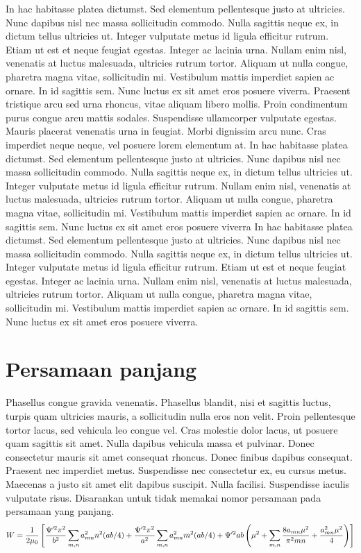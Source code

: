 \documentclass{article}
\begin{document}
In hac habitasse platea dictumst. Sed elementum pellentesque justo at ultricies. Nunc dapibus nisl nec massa sollicitudin commodo. Nulla sagittis neque ex, in dictum tellus ultricies ut. Integer vulputate metus id ligula efficitur rutrum. Etiam ut est et neque feugiat egestas. Integer ac lacinia urna. 
Nullam enim nisl, venenatis at luctus malesuada, ultricies rutrum tortor. Aliquam ut nulla congue, pharetra magna vitae, sollicitudin mi. Vestibulum mattis imperdiet sapien ac ornare. In id sagittis sem. Nunc luctus ex sit amet eros posuere viverra. Praesent tristique arcu sed urna rhoncus, vitae aliquam libero mollis. Proin condimentum purus congue arcu mattis sodales. Suspendisse ullamcorper vulputate egestas. Mauris placerat venenatis urna in feugiat. Morbi dignissim arcu nunc. Cras imperdiet neque neque, vel posuere lorem elementum at. 
In hac habitasse platea dictumst. Sed elementum pellentesque justo at ultricies. Nunc dapibus nisl nec massa sollicitudin commodo. Nulla sagittis neque ex, in dictum tellus ultricies ut. Integer vulputate metus id ligula efficitur rutrum.
Nullam enim nisl, venenatis at luctus malesuada, ultricies rutrum tortor. Aliquam ut nulla congue, pharetra magna vitae, sollicitudin mi. Vestibulum mattis imperdiet sapien ac ornare. In id sagittis sem. Nunc luctus ex sit amet eros posuere viverra
In hac habitasse platea dictumst. Sed elementum pellentesque justo at ultricies. Nunc dapibus nisl nec massa sollicitudin commodo. Nulla sagittis neque ex, in dictum tellus ultricies ut. Integer vulputate metus id ligula efficitur rutrum. Etiam ut est et neque feugiat egestas. Integer ac lacinia urna. 
Nullam enim nisl, venenatis at luctus malesuada, ultricies rutrum tortor. Aliquam ut nulla congue, pharetra magna vitae, sollicitudin mi. Vestibulum mattis imperdiet sapien ac ornare. In id sagittis sem. Nunc luctus ex sit amet eros posuere viverra.

\section{Persamaan panjang}
Phasellus congue gravida venenatis. Phasellus blandit, nisi et sagittis luctus, turpis quam ultricies mauris, a sollicitudin nulla eros non velit. Proin pellentesque tortor lacus, sed vehicula leo congue vel. Cras molestie dolor lacus, ut posuere quam sagittis sit amet. Nulla dapibus vehicula massa et pulvinar. Donec consectetur mauris sit amet consequat rhoncus. Donec finibus dapibus consequat. Praesent nec imperdiet metus. Suspendisse nec consectetur ex, eu cursus metus. Maecenas a justo sit amet elit dapibus suscipit. Nulla facilisi. Suspendisse iaculis vulputate risus. 
Disarankan untuk tidak memakai nomor persamaan pada persamaan yang panjang.
\begin{equation}
W = \frac{1}{2\mu_0}\left[\frac{\Psi'^2 \pi^2}{b^2} \sum_{m,n} a_{mn}^2 n^2 (ab/4) + \frac{\Psi'^2 \pi^2}{a^2} \sum_{m,n} a_{mn}^2 m^2 (ab/4) + \Psi'^2ab\left(\mu^2 + \sum_{m,n} \frac{8a_{mn} \mu^2}{\pi^2 mn} + \frac{a_{mn}^2 \mu^2}{4}\right)\right]\notag
\end{equation}
\end{document}
